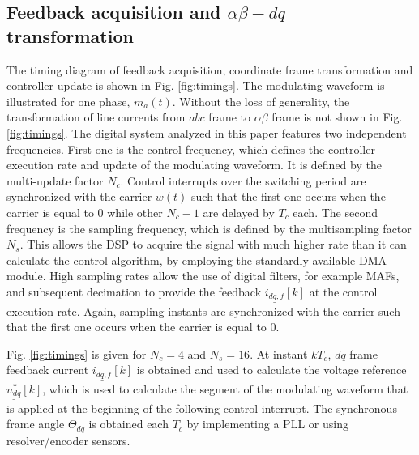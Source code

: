 \documentclass[conference]{IEEEtran}
\begin{document}
\subsection{Feedback acquisition and $\alpha \beta - dq$ transformation}

The timing diagram of feedback acquisition, coordinate frame transformation and controller update is shown in Fig. \ref{fig:timings}. The modulating waveform is illustrated for one phase, $m_a(t)$. Without the loss of generality, the transformation of line currents from $abc$ frame to $\alpha \beta$ frame is not shown in Fig. \ref{fig:timings}.
The digital system analyzed in this paper features two independent frequencies. First one is the control frequency, which defines the controller execution rate and update of the modulating waveform. It is defined by the multi-update factor $N_c$. Control interrupts over the switching period are synchronized with the carrier $w(t)$ such that the first one occurs when the carrier is equal to $0$ while other $N_c-1$ are delayed by $T_c$ each. 
The second frequency is the sampling frequency, which is defined by the multisampling factor $N_s$. This allows the DSP to acquire the signal with much higher rate than it can calculate the control algorithm, by employing the standardly available DMA module. High sampling rates allow the use of digital filters, for example MAFs, and subsequent decimation to provide the feedback $\underline{i_{dq,f}}[k]$ at the control execution rate.
Again, sampling instants are synchronized with the carrier such that the first one occurs when the carrier is equal to $0$. 

Fig. \ref{fig:timings} is given for $N_c = 4$ and $N_s = 16$. At instant $kT_c$, $dq$ frame feedback current $\underline{i_{dq,f}}[k]$ is obtained and used to calculate the voltage reference $\underline{u^*_{dq}}[k]$, which is used to calculate the segment of the modulating waveform that is applied at the beginning of the following control interrupt. The synchronous frame angle $\Theta_{dq}$ is obtained each $T_c$ by implementing a PLL or using resolver/encoder sensors. 
\end{document}

